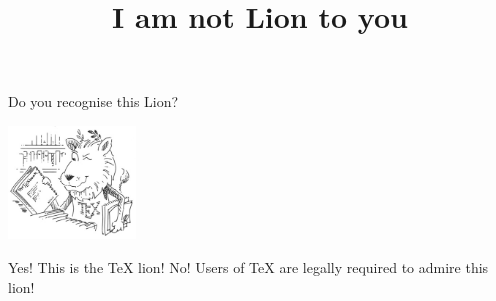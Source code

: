 \documentclass{webquiz}
\title{I am not Lion to you}
\begin{document}
\begin{question}
  Do you recognise this Lion?
  \begin{center}
      \includegraphics[height=30mm]{ctanLion}
  \end{center}

  \begin{choice}
    \correct Yes!   \response This is the \TeX{} lion!
    \incorrect No!  \response Users of \TeX{} are legally required to admire this lion!
  \end{choice}
\end{question}
\end{document}
